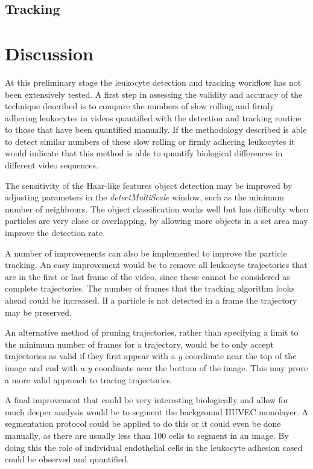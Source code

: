 \subsection{Tracking}
\label{leukocytes:validation:tracking}

\section{Discussion}
\label{leukocytes:discussion}
At this preliminary stage the leukocyte detection and tracking workflow has not been extensively tested. A first step in assessing the validity and accuracy of the technique described is to compare the numbers of slow rolling and firmly adhering leukocytes in videos quantified with the detection and tracking routine to those that have been quantified manually. If the methodology described is able to detect similar numbers of these slow rolling or firmly adhering leukocytes it would indicate that this method is able to quantify biological differences in different video sequences. 

The sensitivity of the Haar-like features object detection may be improved by adjusting parameters in the \emph{detectMultiScale} window, such as the minimum number of neighbours. The object classification works well but has difficulty when particles are very close or overlapping, by allowing more objects in a set area may improve the detection rate.

A number of improvements can also be implemented to improve the particle tracking. An easy improvement would be to remove all leukocyte trajectories that are in the first or last frame of the video, since these cannot be considered as complete trajectories. The number of frames that the tracking algorithm looks ahead could be increased. If a particle is not detected in a frame the trajectory may be preserved.

An alternative method of pruning trajectories, rather than specifying a limit to the minimum number of frames for a trajectory, would be to only accept trajectories as valid if they first appear with a $y$ coordinate near the top of the image and end with a $y$ coordinate near the bottom of the image. This may prove a more valid approach to tracing trajectories.

A final improvement that could be very interesting biologically and allow for much deeper analysis would be to segment the background HUVEC monolayer. A segmentation protocol could be applied to do this or it could even be done manually, as there are usually less than 100 cells to segment in an image. By doing this the role of individual endothelial cells in the leukocyte adhesion cased could be observed and quantified. 
